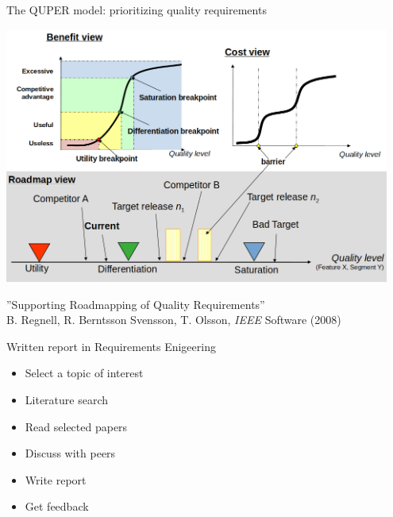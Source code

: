 \documentclass{simpleslides}
\begin{document}
\begin{frame}[fragile]{The QUPER model: prioritizing quality requirements}
\begin{center}
\includegraphics[width=0.95\textwidth]{img/quper}
\end{center}%
{\footnotesize ''Supporting Roadmapping of Quality Requirements'' 
\\ B. Regnell, R. Berntsson Svensson, T. Olsson, \emph{IEEE} Software (2008)}
\end{frame}
  

\begin{frame}[fragile]{Written report in Requirements Enigeering}
\begin{itemize}
\item Select a topic of interest
\item Literature search
\item Read selected papers
\item Discuss with peers
\item Write report
\item Get feedback
\end{itemize}
\end{frame}
\end{document}
